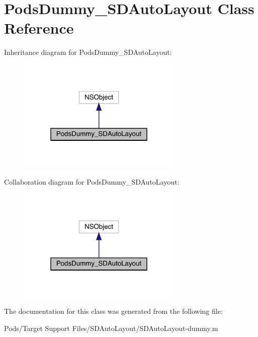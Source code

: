 \hypertarget{interface_pods_dummy___s_d_auto_layout}{}\section{Pods\+Dummy\+\_\+\+S\+D\+Auto\+Layout Class Reference}
\label{interface_pods_dummy___s_d_auto_layout}


Inheritance diagram for Pods\+Dummy\+\_\+\+S\+D\+Auto\+Layout\+:\nopagebreak
\begin{figure}[H]
\begin{center}
\leavevmode
\includegraphics[width=223pt]{interface_pods_dummy___s_d_auto_layout__inherit__graph}
\end{center}
\end{figure}


Collaboration diagram for Pods\+Dummy\+\_\+\+S\+D\+Auto\+Layout\+:\nopagebreak
\begin{figure}[H]
\begin{center}
\leavevmode
\includegraphics[width=223pt]{interface_pods_dummy___s_d_auto_layout__coll__graph}
\end{center}
\end{figure}


The documentation for this class was generated from the following file\+:\begin{DoxyCompactItemize}
\item 
Pods/\+Target Support Files/\+S\+D\+Auto\+Layout/S\+D\+Auto\+Layout-\/dummy.\+m\end{DoxyCompactItemize}
